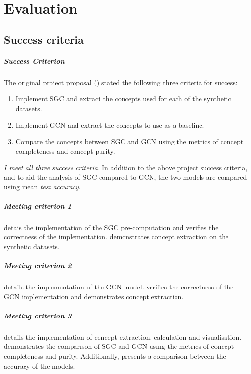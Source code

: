 \chapter{Evaluation}
\label{ch:evaluation}

\section{Success criteria}

\paragraph{Success Criterion}
The original project proposal () stated the following three criteria for success:
\begin{enumerate}
    \item 
        Implement SGC and extract the concepts used for each of the synthetic datasets.
        \label{crit1}
    \item 
        Implement GCN and extract the concepts to use as a baseline.
        \label{crit2}
    \item 
        Compare the concepts between SGC and GCN using the metrics of concept completeness and concept purity.
        \label{crit3}
\end{enumerate}

\emph{I meet all three success criteria.}
In addition to the above project success criteria, and to aid the analysis of SGC compared to GCN, the two models are compared using mean \emph{test accuracy}.

\paragraph{Meeting criterion 1}
 detais the implementation of the SGC pre-computation and  verifies the correctness of the implementation.
 demonstrates concept extraction on the synthetic datasets.

\paragraph{Meeting criterion 2}
 details the implementation of the GCN model.
 verifies the correctness of the GCN implementation and demonstrates concept extraction.

\paragraph{Meeting criterion 3}
 details the implementation of concept extraction, calculation and visualisation.
 demonstrates the comparison of SGC and GCN using the metrics of concept completeness and purity.
Additionally,  presents a comparison between the accuracy of the models.

